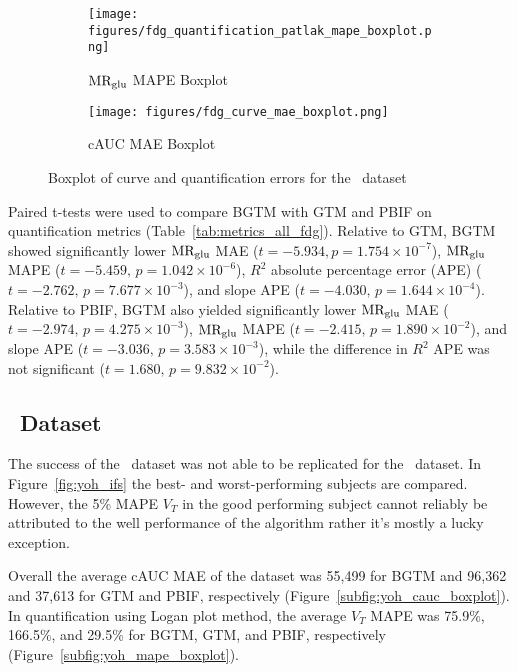 \begin{figure}[h]
	\centering
	\begin{subfigure}[b]{0.45\textwidth}
		\texttt{[image: figures/fdg\_quantification\_patlak\_mape\_boxplot.png]}
		\caption{\(\text{MR}_{\text{glu}}\) MAPE Boxplot}
		\label{subfig:fdg_mape_boxplot}
	\end{subfigure}
	\begin{subfigure}[b]{0.45\textwidth}
		\texttt{[image: figures/fdg\_curve\_mae\_boxplot.png]}
		\caption{cAUC MAE Boxplot}
		\label{subfig:fdg_cauc_boxplot}
	\end{subfigure}
	\caption{Boxplot of curve and quantification errors for the \fdg\ dataset}
	\label{fig:fdg_boxplots}
\end{figure}




Paired t-tests were used to compare BGTM with GTM and PBIF on quantification metrics (Table~\ref{tab:metrics_all_fdg}).
Relative to GTM, BGTM showed significantly lower \(\text{MR}_{\text{glu}}\) MAE (\(t=-5.934, p=1.754\times 10^{-7}\)), \(\text{MR}_{\text{glu}}\) MAPE (\(t=-5.459,\,p=1.042\times 10^{-6}\)), \(R^2\) absolute percentage error (APE) (\(t=-2.762,\,p=7.677\times 10^{-3}\)), and slope APE (\(t=-4.030,\,p=1.644\times 10^{-4}\)).
Relative to PBIF, BGTM also yielded significantly lower \(\text{MR}_{\text{glu}}\) MAE (\(t=-2.974,\,p=4.275\times 10^{-3}\)), \(\text{MR}_{\text{glu}}\) MAPE (\(t=-2.415,\,p=1.890\times 10^{-2}\)), and slope APE (\(t=-3.036,\,p=3.583\times 10^{-3}\)), while the difference in \(R^2\) APE was not significant (\(t=1.680,\,p=9.832\times 10^{-2}\)).


\subsection{\yohimbine\ Dataset}

The success of the \fdg\ dataset was not able to be replicated for the \yohimbine\ dataset.
In Figure~\ref{fig:yoh_ifs} the best- and worst-performing subjects are compared.
However, the 5\% MAPE $V_T$ in the good performing subject cannot reliably be attributed to the well performance of the algorithm rather it's mostly a lucky exception.

Overall the average cAUC MAE of the dataset was 55{,}499 for BGTM and 96{,}362 and 37{,}613 for GTM and PBIF, respectively (Figure~\ref{subfig:yoh_cauc_boxplot}).
In quantification using Logan plot method, the average \(V_T\) MAPE was 75.9\%, 166.5\%, and 29.5\% for BGTM, GTM, and PBIF, respectively (Figure~\ref{subfig:yoh_mape_boxplot}).

